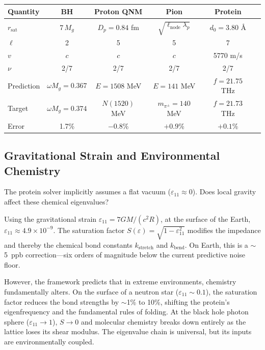 \begin{center}
\renewcommand{\arraystretch}{1.3}
\begin{tabular}{l c c c c c}
\toprule
\textbf{Quantity} & \textbf{BH} & \textbf{Proton QNM} & \textbf{Pion} & \textbf{Protein} \\
\midrule
$r_\mathrm{sat}$ & $7\,M_g$ & $D_p = 0.84$ fm & $\sqrt{\ell_\mathrm{node}\lambda_p}$ & $d_0 = 3.80$ \AA \\
$\ell$ & 2 & 5 & 5 & 7 \\
$v$ & $c$ & $c$ & $c$ & 5770 m/s \\
$\nu$ & 2/7 & 2/7 & 2/7 & 2/7 \\
Prediction & $\omega M_g = 0.367$ & $E = 1508$ MeV & $E = 141$ MeV & $f = 21.75$ THz \\
Target & $\omega M_g = 0.374$ & $N(1520)$ MeV & $m_{\pi^\pm} = 140$ MeV & $f = 21.73$ THz \\
Error & 1.7\% & $-0.8$\% & $+0.9$\% & $+0.1$\% \\
\bottomrule
\end{tabular}
\end{center}

\subsection{Gravitational Strain and Environmental Chemistry}

The protein solver implicitly assumes a flat vacuum ($\varepsilon_{11} \approx 0$). Does local gravity affect these chemical eigenvalues?

Using the gravitational strain $\varepsilon_{11} = 7GM/(c^2 R)$, at the surface of the Earth, $\varepsilon_{11} \approx 4.9 \times 10^{-9}$. The saturation factor $S(\varepsilon) = \sqrt{1 - \varepsilon_{11}^2}$ modifies the impedance and thereby the chemical bond constants $k_\mathrm{stretch}$ and $k_\mathrm{bend}$. On Earth, this is a $\sim$5~ppb correction---six orders of magnitude below the current predictive noise floor.

However, the framework predicts that in extreme environments, chemistry fundamentally alters. On the surface of a neutron star ($\varepsilon_{11} \sim 0.1$), the saturation factor reduces the bond strengths by $\sim$1\% to 10\%, shifting the protein's eigenfrequency and the fundamental rules of folding. At the black hole photon sphere ($\varepsilon_{11} \to 1$), $S \to 0$ and molecular chemistry breaks down entirely as the lattice loses its shear modulus. The eigenvalue chain is universal, but its inputs are environmentally coupled.


